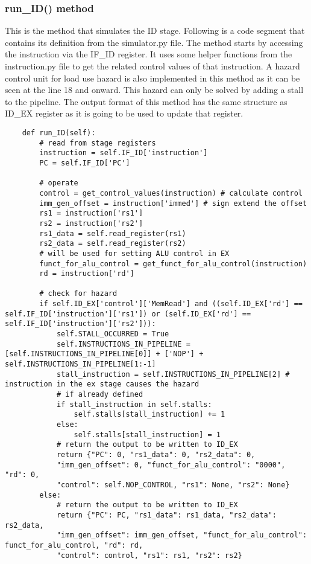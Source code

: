 \subsubsection{run\_ID() method}
This is the method that simulates the ID stage. Following is a code segment that contains its definition from the simulator.py file. The method starts by accessing the instruction via the IF\_ID register. It uses some helper functions from the instruction.py file to get the related control values of that instruction. A hazard control unit for load use hazard is also implemented in this method as it can be seen at the line 18 and onward. This hazard can only be solved by adding a stall to the pipeline. The output format of this method has the same structure as ID\_EX register as it is going to be used to update that register.
\vspace{0.5 cm}
\begin{lstlisting}
    def run_ID(self):
        # read from stage registers
        instruction = self.IF_ID['instruction']
        PC = self.IF_ID['PC']

        # operate
        control = get_control_values(instruction) # calculate control
        imm_gen_offset = instruction['immed'] # sign extend the offset
        rs1 = instruction['rs1']
        rs2 = instruction['rs2']
        rs1_data = self.read_register(rs1)
        rs2_data = self.read_register(rs2)
        # will be used for setting ALU control in EX
        funct_for_alu_control = get_funct_for_alu_control(instruction)
        rd = instruction['rd']

        # check for hazard
        if self.ID_EX['control']['MemRead'] and ((self.ID_EX['rd'] == self.IF_ID['instruction']['rs1']) or (self.ID_EX['rd'] == self.IF_ID['instruction']['rs2'])):
            self.STALL_OCCURRED = True
            self.INSTRUCTIONS_IN_PIPELINE = [self.INSTRUCTIONS_IN_PIPELINE[0]] + ['NOP'] + self.INSTRUCTIONS_IN_PIPELINE[1:-1]
            stall_instruction = self.INSTRUCTIONS_IN_PIPELINE[2] # instruction in the ex stage causes the hazard
            # if already defined
            if stall_instruction in self.stalls:
                self.stalls[stall_instruction] += 1
            else:
                self.stalls[stall_instruction] = 1
            # return the output to be written to ID_EX
            return {"PC": 0, "rs1_data": 0, "rs2_data": 0, 
            "imm_gen_offset": 0, "funct_for_alu_control": "0000", "rd": 0, 
            "control": self.NOP_CONTROL, "rs1": None, "rs2": None}
        else:
            # return the output to be written to ID_EX
            return {"PC": PC, "rs1_data": rs1_data, "rs2_data": rs2_data, 
            "imm_gen_offset": imm_gen_offset, "funct_for_alu_control": funct_for_alu_control, "rd": rd, 
            "control": control, "rs1": rs1, "rs2": rs2}
\end{lstlisting}

